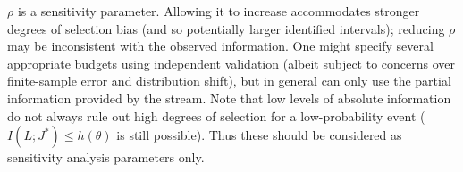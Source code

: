 $\rho$ is a sensitivity parameter. Allowing it to increase accommodates stronger degrees of selection bias (and so potentially larger identified intervals); reducing $\rho$ may be inconsistent with the observed information. One might specify several appropriate budgets using independent validation (albeit subject to concerns over finite-sample error and distribution shift), but in general can only use the partial information provided by the stream. Note that low levels of absolute information do not always rule out high degrees of selection for a low-probability event ($I(L;J^*)\le h(\theta)$ is still possible). Thus these should be considered as sensitivity analysis parameters only.
